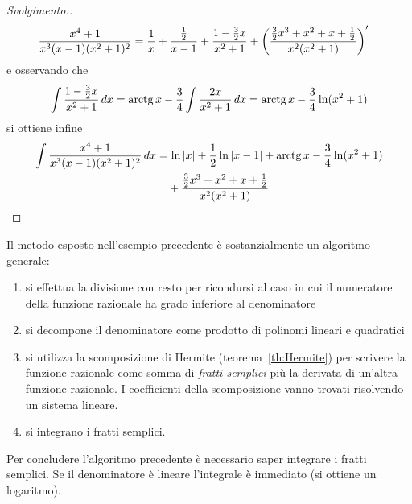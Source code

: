 \begin{proof}[Svolgimento.]
\begin{align*}
\frac{x^4+1}{x^3(x-1)(x^2+1)^2}
&= \frac{1}{x} + \frac{\frac 1 2}{x-1} + \frac{1 - \frac 3 2 x}{x^2+1}
+ {\left( \frac{\frac 3 2 x^3 + x^2 + x + \frac 1 2}{x^2(x^2+1)} \right)}'
\end{align*}
e osservando che
\[
 \int \frac{1 - \frac 3 2 x}{x^2+1}\, dx
 = \operatorname{arctg} x - \frac 3 4 \int \frac{2x}{x^2+1}\, dx
 = \operatorname{arctg} x - \frac 3 4 \ln(x^2+1)
\]
si ottiene infine
\begin{align*}
\int \frac{x^4+1}{x^3(x-1)(x^2+1)^2}\, dx
 &= \ln {\left|x\right|} + \frac 1 2 \ln{\left|x-1\right|} + \operatorname{arctg} x - \frac 3 4 \ln(x^2+1) \\
 &\quad + \frac{\frac 3 2 x^3 + x^2+x+\frac 1 2}{x^2(x^2+1)}
\end{align*}
\end{proof}

Il metodo esposto nell'esempio precedente è sostanzialmente
un algoritmo generale:
\begin{enumerate}
  \item si effettua la divisione con resto per ricondursi
  al caso in cui il numeratore della funzione razionale
  ha grado inferiore al denominatore
  \item si decompone il denominatore come prodotto di
  polinomi lineari e quadratici
  \item si utilizza la scomposizione di Hermite (teorema~\ref{th:Hermite})
  per scrivere la funzione razionale come somma di \emph{fratti semplici}
  più la derivata di un'altra funzione razionale. I coefficienti
  della scomposizione vanno trovati risolvendo un sistema lineare.
  \item si integrano i fratti semplici.
\end{enumerate}

Per concludere l'algoritmo precedente è necessario saper integrare i fratti semplici. Se il denominatore è lineare l'integrale è immediato (si ottiene un logaritmo).

